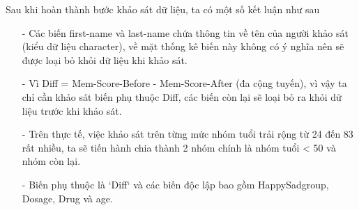 \begin{itemize}
    Sau khi hoàn thành bước khảo sát dữ liệu, ta có một số kết luận như sau
    \begin{itemize}
        \item [-] Các biến first-name và last-name chứa thông tin về tên của người khảo sát (kiểu dữ liệu character), về mặt thống kê biến này không có ý nghĩa nên sẽ được loại bỏ khỏi dữ liệu khi khảo sát.
        \item[-]  Vì Diff = Mem-Score-Before - Mem-Score-After (đa cộng tuyến), vì vậy ta chỉ cần khảo sát biến phụ thuộc Diff, các biến còn lại sẽ loại bỏ ra khỏi dữ liệu trước khi khảo sát.
        \item[-] Trên thực tế, việc khảo sát trên từng mức nhóm tuổi trải rộng từ 24 đến 83 rất nhiều, ta sẽ tiến hành chia thành 2 nhóm chính là nhóm tuổi < 50 và nhóm còn lại.
        \item[-] Biến phụ thuộc là `Diff` và các biến độc lập bao gồm  HappySadgroup, Dosage, Drug và age. 
    \end{itemize}
\end{itemize}

